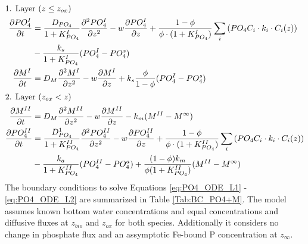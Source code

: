 \documentclass[gmd, manuscript]{copernicus}
\begin{document}
\begin{align}
\intertext{1. Layer ($z \leq z_{ox}$)}
 \frac{\partial PO_4^I}{\partial t} &= \frac{D_{PO_4}}{1+K_{PO_4}^I} \frac{\partial^2PO_4^I }{\partial z^2} - w\frac{\partial PO_4^I }{\partial z} + \frac{1-\phi}{\phi \cdot (1+K_{PO_4}^I)}\sum_i 
					\left( PO_4C_i \cdot k_i \cdot C_{i}(z) \right) \notag\\
					& - \frac{k_{s}}{1+K_{PO_4}^I}(PO_4^I-PO_4^s)\label{eq:PO4_ODE_L1}\\  %
 \frac{\partial M^I}{\partial t} &= D_{M}\frac{\partial^2M^I }{\partial z^2} - w\frac{\partial M^I }{\partial z} + k_{s}\frac{\phi}{1-\phi}(PO_4^I-PO_4^s)\label{eq:M_ODE_L1}\\  
 \intertext{2. Layer ($z_{ox} < z$)} 
 \frac{\partial M^{II}}{\partial t} & = D_{M}\frac{\partial^2M^{II} }{\partial z^2} - w\frac{\partial M^{II} }{\partial z} - k_{m}(M^{II} - M^\infty)\label{eq:M_ODE_L2}\\  
 \frac{\partial PO_4^{II}}{\partial t} &= \frac{D_{PO_4}^1}{1+K_{PO_4}^{II}} \frac{\partial^2PO_4^{II} }{\partial z^2} - w\frac{\partial PO_4^{II} }{\partial z} + \frac{1-\phi}{\phi \cdot (1+K_{PO_4}^{II})}\sum_i 
					\left( PO_4C_i \cdot k_i \cdot C_{i}(z) \right) \notag\\
					& - \frac{k_{a}}{1+K_{PO_4}^{II}}(PO_4^{II}-PO_4^a) + \frac{(1-\phi)k_{m}}{\phi(1+K_{PO_4}^{II})}(M^{II}-M^\infty)\label{eq:PO4_ODE_L2}\\
\end{align}
The boundary conditions to solve Equations \ref{eq:PO4_ODE_L1} - \ref{eq:PO4_ODE_L2} are summarized in Table \ref{Tab:BC_PO4+M}. 
The model assumes known bottom water concentrations and equal concentrations and diffusive fluxes at $z_{bio}$ and $z_{ox}$ for both species. Additionally it considers no change in phosphate flux and an assymptotic Fe-bound P 
concentration at $z_\infty$. 
\end{document}
